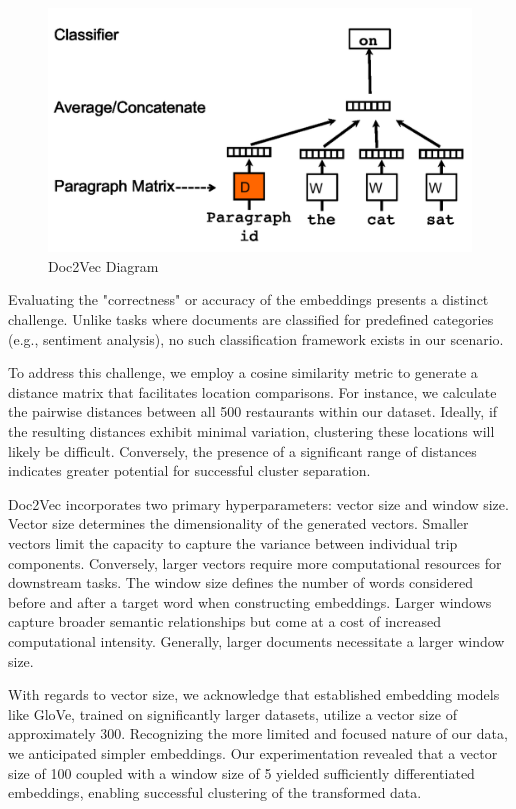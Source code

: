 \documentclass[12pt,a4paper]{report}
\begin{document}
\begin{figure}[H]
    \centering
    \includegraphics[scale=.6]{doc2vec}
    \caption{Doc2Vec Diagram\citep{le2014distributed}}
\end{figure}

Evaluating the "correctness" or accuracy of the embeddings presents a distinct challenge.  Unlike tasks where documents are classified for predefined categories (e.g., sentiment analysis), no such classification framework exists in our scenario.

To address this challenge, we employ a cosine similarity metric to generate a distance matrix that facilitates location comparisons.  For instance, we calculate the pairwise distances between all 500 restaurants within our dataset.  Ideally, if the resulting distances exhibit minimal variation, clustering these locations will likely be difficult.  Conversely, the presence of a significant range of distances indicates greater potential for successful cluster separation.

Doc2Vec incorporates two primary hyperparameters: vector size and window size.  Vector size determines the dimensionality of the generated vectors.  Smaller vectors limit the capacity to capture the variance between individual trip components.  Conversely, larger vectors require more computational resources for downstream tasks.  The window size defines the number of words considered before and after a target word when constructing embeddings.  Larger windows capture broader semantic relationships but come at a cost of increased computational intensity.  Generally, larger documents necessitate a larger window size.

With regards to vector size, we acknowledge that established embedding models like GloVe, trained on significantly larger datasets, utilize a vector size of approximately 300\citep{pennington-etal-2014-glove}.  Recognizing the more limited and focused nature of our data, we anticipated simpler embeddings.  Our experimentation revealed that a vector size of 100 coupled with a window size of 5 yielded sufficiently differentiated embeddings, enabling successful clustering of the transformed data.
\end{document}
